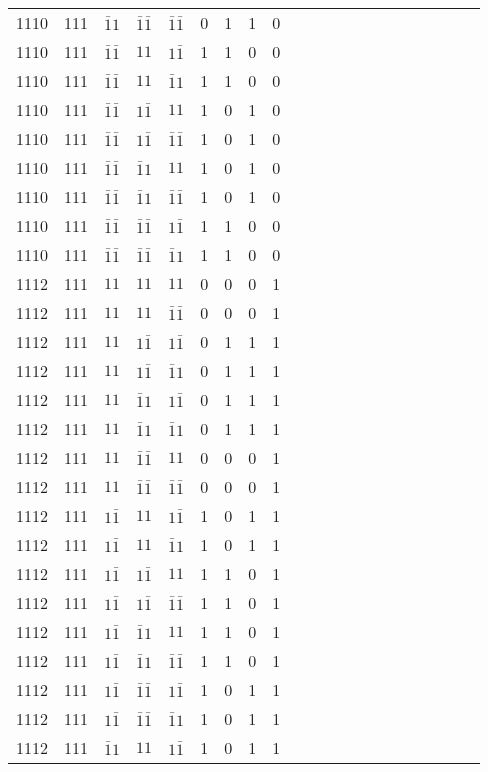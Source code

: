 \begin{longtable*}{c| cccccccccccccccccccc }
1110& 111& $\bar{1}1$& $\bar{1}\bar{1}$& $\bar{1}\bar{1}$& 0& 1& 1& 0\\
1110& 111& $\bar{1}\bar{1}$& $11$& $1\bar{1}$& 1& 1& 0& 0\\
1110& 111& $\bar{1}\bar{1}$& $11$& $\bar{1}1$& 1& 1& 0& 0\\
1110& 111& $\bar{1}\bar{1}$& $1\bar{1}$& $11$& 1& 0& 1& 0\\
1110& 111& $\bar{1}\bar{1}$& $1\bar{1}$& $\bar{1}\bar{1}$& 1& 0& 1& 0\\
1110& 111& $\bar{1}\bar{1}$& $\bar{1}1$& $11$& 1& 0& 1& 0\\
1110& 111& $\bar{1}\bar{1}$& $\bar{1}1$& $\bar{1}\bar{1}$& 1& 0& 1& 0\\
1110& 111& $\bar{1}\bar{1}$& $\bar{1}\bar{1}$& $1\bar{1}$& 1& 1& 0& 0\\
1110& 111& $\bar{1}\bar{1}$& $\bar{1}\bar{1}$& $\bar{1}1$& 1& 1& 0& 0\\
1112& 111& $11$& $11$& $11$& 0& 0& 0& 1\\
1112& 111& $11$& $11$& $\bar{1}\bar{1}$& 0& 0& 0& 1\\
1112& 111& $11$& $1\bar{1}$& $1\bar{1}$& 0& 1& 1& 1\\
1112& 111& $11$& $1\bar{1}$& $\bar{1}1$& 0& 1& 1& 1\\
1112& 111& $11$& $\bar{1}1$& $1\bar{1}$& 0& 1& 1& 1\\
1112& 111& $11$& $\bar{1}1$& $\bar{1}1$& 0& 1& 1& 1\\
1112& 111& $11$& $\bar{1}\bar{1}$& $11$& 0& 0& 0& 1\\
1112& 111& $11$& $\bar{1}\bar{1}$& $\bar{1}\bar{1}$& 0& 0& 0& 1\\
1112& 111& $1\bar{1}$& $11$& $1\bar{1}$& 1& 0& 1& 1\\
1112& 111& $1\bar{1}$& $11$& $\bar{1}1$& 1& 0& 1& 1\\
1112& 111& $1\bar{1}$& $1\bar{1}$& $11$& 1& 1& 0& 1\\
1112& 111& $1\bar{1}$& $1\bar{1}$& $\bar{1}\bar{1}$& 1& 1& 0& 1\\
1112& 111& $1\bar{1}$& $\bar{1}1$& $11$& 1& 1& 0& 1\\
1112& 111& $1\bar{1}$& $\bar{1}1$& $\bar{1}\bar{1}$& 1& 1& 0& 1\\
1112& 111& $1\bar{1}$& $\bar{1}\bar{1}$& $1\bar{1}$& 1& 0& 1& 1\\
1112& 111& $1\bar{1}$& $\bar{1}\bar{1}$& $\bar{1}1$& 1& 0& 1& 1\\
1112& 111& $\bar{1}1$& $11$& $1\bar{1}$& 1& 0& 1& 1\\

\end{longtable*}
